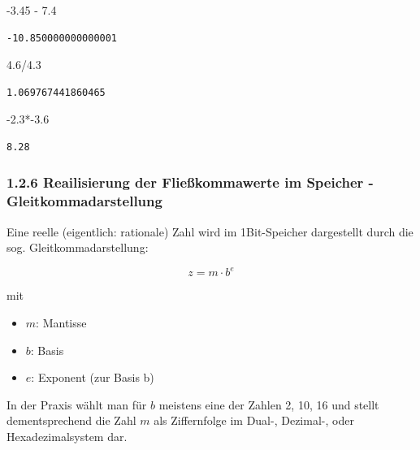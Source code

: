 \documentclass[
  11pt,
  a4paper,
  DIV=11,
  numbers=noendperiod]{scrartcl}
\newenvironment{Shaded}{\begin{snugshade}}{\end{snugshade}}
\newcommand{\FloatTok}[1]{\textcolor[rgb]{0.68,0.00,0.00}{#1}}
\newcommand{\OperatorTok}[1]{\textcolor[rgb]{0.37,0.37,0.37}{#1}}
\providecommand{\tightlist}{%
  \setlength{\itemsep}{0pt}\setlength{\parskip}{0pt}}\usepackage{longtable,booktabs,array}
\begin{document}
\begin{Shaded}
\begin{Highlighting}[numbers=left,,]
\OperatorTok{{-}}\FloatTok{3.45} \OperatorTok{{-}} \FloatTok{7.4}
\end{Highlighting}
\end{Shaded}

\begin{verbatim}
-10.850000000000001
\end{verbatim}

\begin{Shaded}
\begin{Highlighting}[numbers=left,,]
\FloatTok{4.6}\OperatorTok{/}\FloatTok{4.3}
\end{Highlighting}
\end{Shaded}

\begin{verbatim}
1.069767441860465
\end{verbatim}

\begin{Shaded}
\begin{Highlighting}[numbers=left,,]
\OperatorTok{{-}}\FloatTok{2.3}\OperatorTok{*{-}}\FloatTok{3.6}
\end{Highlighting}
\end{Shaded}

\begin{verbatim}
8.28
\end{verbatim}

\subsubsection{1.2.6 Reailisierung der Fließkommawerte im Speicher -
Gleitkommadarstellung}\label{reailisierung-der-flieuxdfkommawerte-im-speicher---gleitkommadarstellung}

Eine reelle (eigentlich: rationale) Zahl wird im 1Bit-Speicher
dargestellt durch die sog. Gleitkommadarstellung:

\[z = m \cdot b^e\]

mit

\begin{itemize}
\tightlist
\item
  \(m\): Mantisse
\item
  \(b\): Basis
\item
  \(e\): Exponent (zur Basis b)
\end{itemize}

In der Praxis wählt man für \(b\) meistens eine der Zahlen 2, 10, 16 und
stellt dementsprechend die Zahl \(m\) als Ziffernfolge im Dual-,
Dezimal-, oder Hexadezimalsystem dar.
\end{document}

